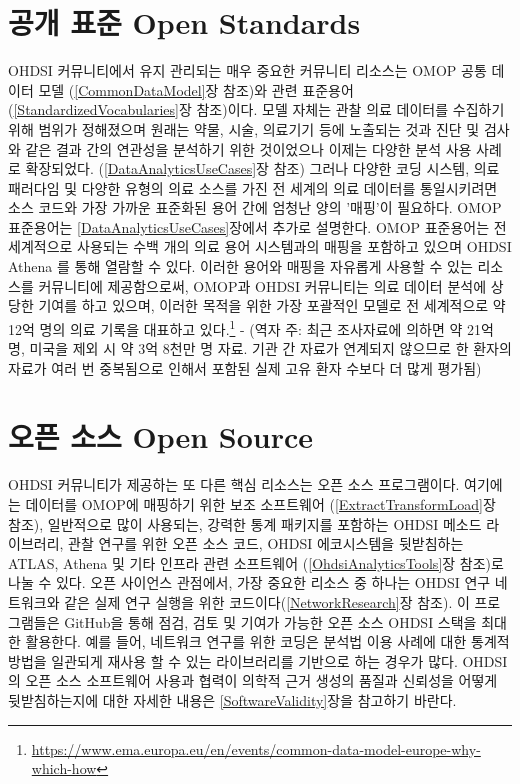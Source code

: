 \documentclass[10.5pt]{book}
\let\rmarkdownfootnote\footnote%
\def\footnote{\protect\rmarkdownfootnote}
\theoremstyle{definition}
\theoremstyle{definition}
\theoremstyle{definition}
\theoremstyle{remark}
\begin{document}
\section{공개 표준 Open Standards}\label{--open-standards}


OHDSI 커뮤니티에서 유지 관리되는 매우 중요한 커뮤니티 리소스는 OMOP 공통
데이터 모델 (\ref{CommonDataModel}장 참조)와 관련 표준용어
(\ref{StandardizedVocabularies}장 참조)이다. 모델 자체는 관찰 의료
데이터를 수집하기 위해 범위가 정해졌으며 원래는 약물, 시술, 의료기기
등에 노출되는 것과 진단 및 검사와 같은 결과 간의 연관성을 분석하기 위한
것이었으나 이제는 다양한 분석 사용 사례로 확장되었다.
(\ref{DataAnalyticsUseCases}장 참조) 그러나 다양한 코딩 시스템, 의료
패러다임 및 다양한 유형의 의료 소스를 가진 전 세계의 의료 데이터를
통일시키려면 소스 코드와 가장 가까운 표준화된 용어 간에 엄청난 양의
'매핑'이 필요하다. OMOP 표준용어는 \ref{DataAnalyticsUseCases}장에서
추가로 설명한다. OMOP 표준용어는 전 세계적으로 사용되는 수백 개의 의료
용어 시스템과의 매핑을 포함하고 있으며 OHDSI Athena 를 통해 열람할 수
있다. 이러한 용어와 매핑을 자유롭게 사용할 수 있는 리소스를 커뮤니티에
제공함으로써, OMOP과 OHDSI 커뮤니티는 의료 데이터 분석에 상당한 기여를
하고 있으며, 이러한 목적을 위한 가장 포괄적인 모델로 전 세계적으로 약
12억 명의 의료 기록을 대표하고 있다.\footnote{\url{https://www.ema.europa.eu/en/events/common-data-model-europe-why-which-how}}
\citep{garza_2016} - (역자 주: 최근 조사자료에 의하면 약 21억 명, 미국을
제외 시 약 3억 8천만 명 자료. 기관 간 자료가 연계되지 않으므로 한 환자의
자료가 여러 번 중복됨으로 인해서 포함된 실제 고유 환자 수보다 더 많게
평가됨)

\section{오픈 소스 Open Source}\label{--open-source}


OHDSI 커뮤니티가 제공하는 또 다른 핵심 리소스는 오픈 소스 프로그램이다.
여기에는 데이터를 OMOP에 매핑하기 위한 보조 소프트웨어
(\ref{ExtractTransformLoad}장 참조), 일반적으로 많이 사용되는, 강력한
통계 패키지를 포함하는 OHDSI 메소드 라이브러리, 관찰 연구를 위한 오픈
소스 코드, OHDSI 에코시스템을 뒷받침하는 ATLAS, Athena 및 기타 인프라
관련 소프트웨어 (\ref{OhdsiAnalyticsTools}장 참조)로 나눌 수 있다. 오픈
사이언스 관점에서, 가장 중요한 리소스 중 하나는 OHDSI 연구 네트워크와
같은 실제 연구 실행을 위한 코드이다(\ref{NetworkResearch}장 참조). 이
프로그램들은 GitHub을 통해 점검, 검토 및 기여가 가능한 오픈 소스 OHDSI
스택을 최대한 활용한다. 예를 들어, 네트워크 연구를 위한 코딩은 분석법
이용 사례에 대한 통계적 방법을 일관되게 재사용 할 수 있는 라이브러리를
기반으로 하는 경우가 많다. OHDSI의 오픈 소스 소프트웨어 사용과 협력이
의학적 근거 생성의 품질과 신뢰성을 어떻게 뒷받침하는지에 대한 자세한
내용은 \ref{SoftwareValidity}장을 참고하기 바란다.
\end{document}
